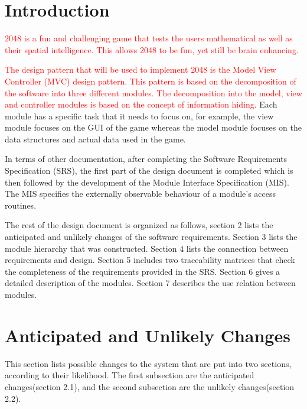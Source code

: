 \documentclass[12pt]{article}
\begin{document}
\section{Introduction}
\textcolor{red}{2048 is a fun and challenging game that tests the users mathematical as well as 
their spatial intelligence. This allows 2048 to be fun, yet still be brain 
enhancing.}  \par
\textcolor{red}{The design pattern that will be used to implement 2048 is the Model View Controller (MVC) design pattern. This pattern is based on the decomposition of the software into three different modules. The decomposition into the model, view and controller modules is based on the concept of information hiding.} Each module has a specific task that it needs to focus on, for example, the view module focuses on the GUI of the game whereas the model module focuses on the data structures and actual data used in the game. \par
In terms of other documentation, after completing the Software Requirements Specification (SRS), the first part of the design document is completed which is then followed by the development of the Module Interface Specification (MIS). The MIS specifies the externally observable behaviour of a module's access routines. \par
The rest of the design document is organized as follows, section 2 lists the anticipated and unlikely changes of the software requirements. Section 3 lists the module hierarchy that was constructed. Section 4 lists the connection between requirements and design. Section 5 includes two traceability matrices that check the completeness of the requirements provided in the SRS. Section 6 gives a detailed description of the modules. Section 7 describes the use relation between modules. 

\section{Anticipated and Unlikely Changes}
This section lists possible changes to the system that are put into two sections, according to their likelihood. The first subsection are the anticipated changes(section 2.1), and the second subsection are the unlikely changes(section 2.2).
\end{document}

